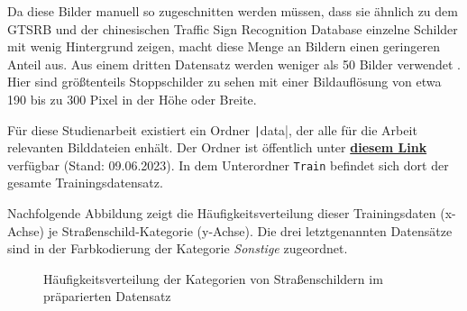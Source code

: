 Da diese Bilder manuell so zugeschnitten werden müssen, dass sie ähnlich zu dem \ac{GTSRB} und der chinesischen Traffic Sign Recognition Database einzelne Schilder mit wenig Hintergrund zeigen, macht diese Menge an Bildern einen geringeren Anteil aus. Aus einem dritten Datensatz werden weniger als 50 Bilder verwendet \cite{dataset-make-ml}. Hier sind größtenteils Stoppschilder zu sehen mit einer Bildauflösung von etwa 190 bis zu 300 Pixel in der Höhe oder Breite.

Für diese Studienarbeit existiert ein Ordner \texttt|data|, der alle für die Arbeit relevanten Bilddateien enhält. Der Ordner ist öffentlich unter \href{https://drive.google.com/drive/folders/11gaUErheUYb0WlBPtWhxgCK7mE0URHYI?usp=sharing}{\textbf{diesem Link}} verfügbar (Stand: 09.06.2023). In dem Unterordner \texttt{Train} befindet sich dort der gesamte Trainingsdatensatz.

Nachfolgende Abbildung zeigt die Häufigkeitsverteilung dieser Trainingsdaten (x-Achse) je Straßenschild-Kategorie (y-Achse). Die drei letztgenannten Datensätze sind in der Farbkodierung der Kategorie \emph{Sonstige} zugeordnet.

\begin{figure}[H]
\caption{Häufigkeitsverteilung der Kategorien von Straßenschildern im präparierten Datensatz}
\end{figure}

